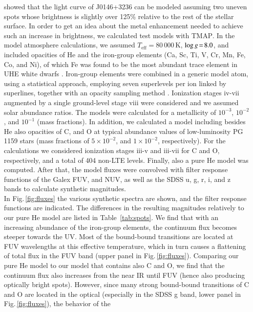 \documentclass{aa}
\newcommand{\loggw}[1]{\mbox{$\log g\hspace{-0.5mm} =\hspace{-0.5mm}  #1$}}
\newcommand{\fg}[1]{\mbox{Fig.\,\ref{#1}}}
\newcommand{\Teff}{\mbox{$T_\mathrm{eff}$}\xspace}
\begin{document}
\cite{Reindl+2019} showed that the light curve of J0146+3236 can be modeled
assuming two uneven spots whose brightness is slightly over 125\% relative
to the rest of the stellar surface.
In order to get an idea about the metal enhancement needed to achieve
such an increase in brightness, we calculated test models with \textsc{TMAP}.
In the model atmosphere calculations, we assumed \Teff$=80\,000$\,K,
\loggw{8.0}, and included opacities of He and the iron-group elements
(Ca, Sc, Ti, V, Cr, Mn, Fe, Co, and Ni), of which Fe was found to be the
most abundant trace element in UHE white dwarfs \citep{Werner+2018b}.
Iron-group elements were combined in a generic model atom, using a
statistical approach, employing seven superlevels per ion linked by
superlines, together with an opacity sampling method
\citep{Anderson1989, rauchdeetjen2003}. Ionization stages
{\sc iv}-{\sc vii} augmented by a single ground-level stage {\sc viii} were
considered and we assumed solar abundance ratios. The models were calculated
for a metallicity of $10^{-3}$, $10^{-2}$, and $10^{-1}$ (mass fractions).
In addition, we calculated a model including besides He also opacities of C,
and O at typical abundance values of low-luminosity PG\,1159 stars (mass
fractions of $5\times10^{-2}$, and $1\times10^{-2}$, respectively). For the calculations we considered
ionization stages {\sc iii}-{\sc v} and {\sc iii}-{\sc vii} for C and O,
respectively, and a total of 404 non-LTE levels. Finally, also a pure He
model was computed. After that, the model fluxes were convolved with
filter response functions of the Galex FUV, and NUV, as well as the
SDSS u, g, r, i, and z bands to calculate synthetic magnitudes.\\
In \fg{fig:fluxes} the various synthetic spectra are shown, and the filter
response functions are indicated. The differences in the resulting magnitudes
relatively to our pure He model are listed in Table~\ref{tab:spots}.
We find that with an increasing abundance of the iron-group elements, the
continuum flux becomes steeper towards the UV. Most of the bound-bound
transitions are located at FUV wavelengths at this effective temperature,
which in turn causes a flattening of total flux in the FUV
band (upper panel in \fg{fig:fluxes}). Comparing our pure He model to our
model that contains also C and O, we find that the continuum flux also
increases from the near IR until FUV (hence also producing optically bright spots).
However, since many strong bound-bound transitions of C and O are located in
the optical (especially in the SDSS g band, lower panel in \fg{fig:fluxes}), the behavior of the
\end{document}

